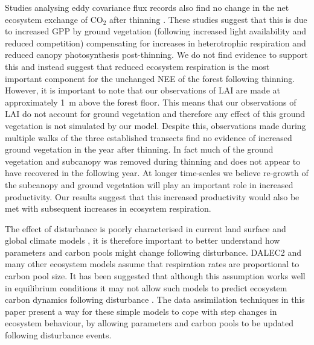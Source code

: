 \documentclass[12pt]{article}
\begin{document}
Studies analysing eddy covariance flux records also find no change in the net ecosystem exchange of CO\(_{2}\) after thinning \citep{vesala2005effect, wilkinson2015effects, moreaux2011paired, dore2012recovery}. These studies suggest that this is due to increased GPP by ground vegetation (following increased light availability and reduced competition) compensating for increases in heterotrophic respiration and reduced canopy photosynthesis post-thinning. We do not find evidence to support this and instead suggest that reduced ecosystem respiration is the most important component for the unchanged NEE of the forest following thinning. However, it is important to note that our observations of LAI are made at approximately 1~m above the forest floor. This means that our observations of LAI do not account for ground vegetation and therefore any effect of this ground vegetation is not simulated by our model. Despite this, observations made during multiple walks of the three established transects find no evidence of increased ground vegetation in the year after thinning. In fact much of the ground vegetation and subcanopy was removed during thinning and does not appear to have recovered in the following year. At longer time-scales we believe re-growth of the subcanopy and ground vegetation will play an important role in increased productivity. Our results suggest that this increased productivity would also be met with subsequent increases in ecosystem respiration.






The effect of disturbance is poorly characterised in current land surface and global climate models \citep{running2008ecosystem}, it is therefore important to better understand how parameters and carbon pools might change following disturbance. DALEC2 and many other ecosystem models assume that respiration rates are proportional to carbon pool size. It has been suggested that although this assumption works well in equilibrium conditions it may not allow such models to predict ecosystem carbon dynamics following disturbance \citep{schimel2003implications}. The data assimilation techniques in this paper present a way for these simple models to cope with step changes in ecosystem behaviour, by allowing parameters and carbon pools to be updated following disturbance events. 
\end{document}

